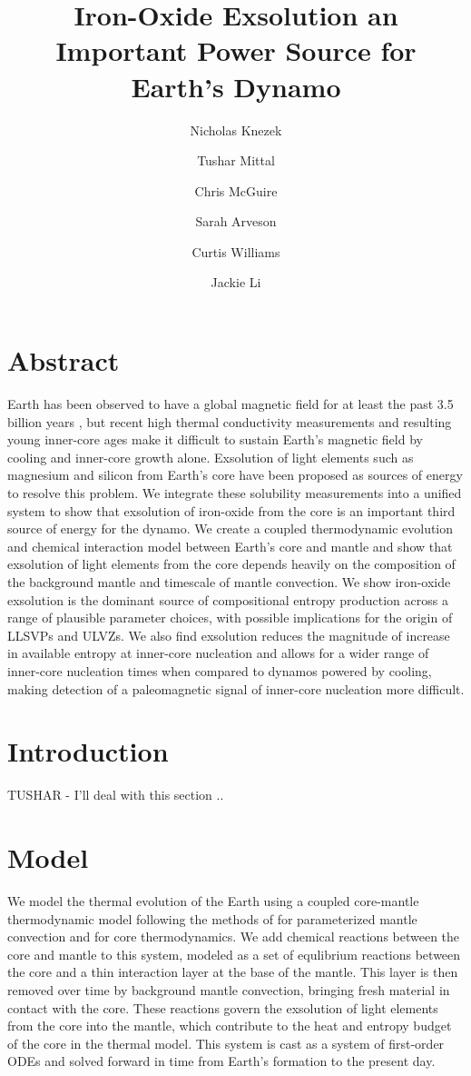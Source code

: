 \documentclass[]{article}
\title{Iron-Oxide Exsolution an Important Power Source for Earth's Dynamo}
\author{Nicholas Knezek
	\and Tushar Mittal
	\and Chris McGuire 
	\and Sarah Arveson
	\and Curtis Williams 
	\and Jackie Li}
\date{}
\begin{document}
	\maketitle
	
	\section{Abstract}\label{abstract}
	Earth has been observed to have a global magnetic field for at least the past 3.5 billion years \citep{Tarduno2015}, but recent high thermal conductivity measurements \citep{Pozzo2012} and resulting young inner-core ages \citep{Labrosse2015} make it difficult to sustain Earth's magnetic field by cooling and inner-core growth alone. Exsolution of light elements such as magnesium \citep{Badro2016,ORourke2016a} and silicon \citep{Hirose2017} from Earth's core have been proposed as sources of energy to resolve this problem. We integrate these solubility measurements into a unified system to show that exsolution of iron-oxide from the core is an important third source of energy for the dynamo. We create a coupled thermodynamic evolution and chemical interaction model between Earth's core and mantle and show that exsolution of light elements from the core depends heavily on the composition of the background mantle and timescale of mantle convection. We show iron-oxide exsolution is the dominant source of compositional entropy production across a range of plausible parameter choices, with possible implications for the origin of LLSVPs and ULVZs.  We also find exsolution reduces the magnitude of increase in available entropy at inner-core nucleation and allows for a wider range of inner-core nucleation times when compared to dynamos powered by cooling, making detection of a paleomagnetic signal of inner-core nucleation more difficult. 
	
	\section{Introduction}\label{introduction}
	
	
	TUSHAR - I'll deal with this section ..
	
	\section{Model}\label{model}
	We model the thermal evolution of the Earth using a coupled core-mantle
	thermodynamic model following the methods of \citet{Stevenson1983} for
	parameterized mantle convection and \citet{Nimmo2015} for core
	thermodynamics. We add chemical reactions between the core and mantle to
	this system, modeled as a set of equlibrium reactions between the core and a thin interaction layer at the base of the mantle. This layer is then removed over time by background mantle convection, bringing fresh material in contact with the core. These reactions govern the exsolution of light elements from the core into the mantle, which contribute to the heat and entropy budget of the core in the thermal model. This system is cast as a system of first-order ODEs and solved forward in time from Earth's formation to the present day.
	
\end{document}
